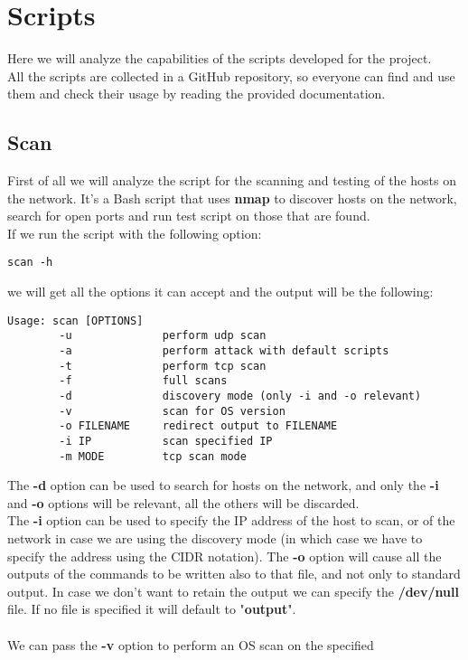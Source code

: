 \chapter{Scripts}
Here we will analyze the capabilities of the scripts developed for the project.\\
All the scripts are collected in a GitHub repository\cite{scripts-github}, so everyone
can find and use them and check their usage by reading the provided
documentation.
\section{Scan}
First of all we will analyze the script for the scanning and testing of the hosts on 
the network. It's a Bash script that uses \textbf{nmap} to discover hosts on the
network, search for open ports and run test script on those that are found.\\
If we run the script with the following option:
\begin{lstlisting}[numbers=none]
    scan -h
\end{lstlisting}
we will get all the options it can accept and the output will be the following:
\begin{lstlisting}[numbers=none]
    Usage: scan [OPTIONS]
        -u              perform udp scan
        -a              perform attack with default scripts
        -t              perform tcp scan
        -f              full scans
        -d              discovery mode (only -i and -o relevant)
        -v              scan for OS version
        -o FILENAME     redirect output to FILENAME
        -i IP           scan specified IP
        -m MODE         tcp scan mode
\end{lstlisting}
The \textbf{-d} option can be used to search for hosts on the network, and
only the \textbf{-i} and \textbf{-o} options will be relevant, all the others will
be discarded.\\
The \textbf{-i} option can be used to specify the IP address of the host to scan,
or of the network in case we are using the discovery mode (in which case we have to
specify the address using the CIDR notation). The \textbf{-o} option will cause 
all the outputs of the commands to be written also to that file, and not only to standard
output. In case we don't want to retain the output we can specify the \textbf{/dev/null} file.
If no file is specified it will default to "\textbf{output}".\\\\
We can pass the \textbf{-v} option to perform an OS scan on the specified
